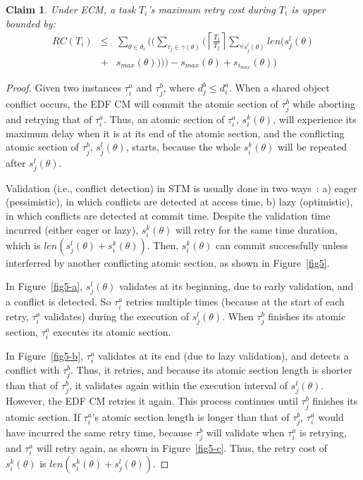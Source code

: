 \documentclass{sig-alternate}
\newtheorem{clm}{Claim}
\begin{document}
\begin{clm}\label{gedf-edf}
Under ECM, a task $T_i$'s maximum retry cost during $T_i$ is upper bounded by:
\begin{eqnarray}
RC\left(T_{i}\right) & \le & \sum_{\theta\in\theta_{i}}\Bigg(\Big(\sum_{\tau_{j}\in\gamma(\theta)}\Big(\left\lceil\frac{T_{i}}{T_{j}}\right\rceil\sum_{\forall s_{j}^{l}(\theta)}len\big(s_{j}^{l}(\theta)\nonumber \\
 & + & s_{max}(\theta)\big)\Big)\Big)-s_{max}(\theta)+s_{i_{max}}(\theta)\Bigg)\label{eq3}\end{eqnarray}
\end{clm}
\begin{proof}
Given two instances $\tau_{i}^a$ and $\tau_{j}^b$, where $d_j^b \le d_i^a$. When a shared object conflict occurs, the EDF CM will commit the atomic section of $\tau_j^b$ while aborting and retrying that of $\tau_i^a$.
Thus, an atomic section of $\tau_i^a$, $s_{i}^{k}(\theta)$,
will experience its maximum delay when it is at its end of the atomic section, 
and the conflicting atomic section of $\tau_j^b$, $s_{j}^{l}(\theta)$, starts, because the whole $s_i^k (\theta)$ will be repeated after $s_j^l (\theta)$.

Validation (i.e., conflict detection) in STM is usually done in two ways~\cite{austenmc:tcc:dissertation:2009}: a) eager (pessimistic), in which conflicts are detected at access time, b) lazy (optimistic), in which conflicts are detected at commit time. Despite the validation time incurred (either eager or lazy),  
$s_{i}^{k}(\theta)$ will retry for the same time duration, which is $len(s_{j}^{l}(\theta)+s_i^k(\theta))$. Then, $s_i^k(\theta)$ can commit successfully  
unless interferred by another conflicting atomic section, as shown in Figure~\ref{fig5}. 

In Figure~\ref{fig5-a}, $s_{j}^{l}(\theta)$
validates at its beginning, due to early validation, and a conflict
is detected. So $\tau_{i}^a$ retries multiple times (because at the start of each retry, $\tau_{i}^a$ validates) 
during the execution of $s_{j}^{l}(\theta)$.
When $\tau_{j}^b$ finishes its atomic section, $\tau_{i}^a$ executes its atomic section. 

In Figure~\ref{fig5-b}, 
$\tau_{i}^a$ validates at its end (due to lazy validation), and detects a conflict with $\tau_{j}^b$.
Thus, it retries, and because its atomic section length is shorter
than that of $\tau_{j}^b$, it validates again within the execution
interval of $s_{j}^{l}(\theta)$. However, the EDF CM retries it again.
This process continues until $\tau_{j}^b$ finishes its atomic section.
If $\tau_{i}^a$'s atomic section length is longer than that of $\tau_{j}^b$,
$\tau_{i}^a$ would have incurred the same retry time, because
$\tau_{j}^b$ will validate when $\tau_{i}^a$ is retrying, and $\tau_{i}^a$ will
retry again, as shown in Figure~\ref{fig5-c}. Thus, the retry cost
of $s_{i}^{k}(\theta)$ is $len(s_{i}^{k}(\theta)+s_{j}^{l}(\theta))$.


\end{proof}
\end{document}
